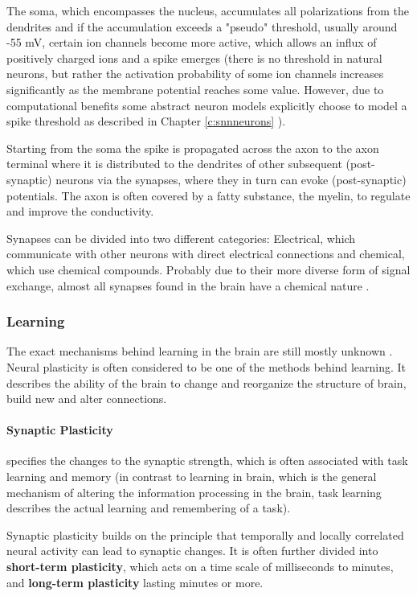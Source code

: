 The soma, which encompasses the nucleus, accumulates all polarizations from the dendrites and if the accumulation exceeds a "pseudo" threshold, usually around -55 mV, certain ion channels become more active, which allows an influx of positively charged ions and a spike emerges (there is no threshold in natural neurons, but rather the activation probability of some ion channels increases significantly as the membrane potential reaches some value. However, due to computational benefits some abstract neuron models explicitly choose to model a spike threshold as described in Chapter \ref{c:snnneurons} ).

Starting from the soma the spike is propagated across the axon to the axon terminal where it is distributed to the dendrites of other subsequent (post-synaptic) neurons via the synapses, where they in turn can evoke (post-synaptic) potentials.
The axon is often covered by a fatty substance, the myelin, to regulate and improve the conductivity.

Synapses can be divided into two different categories: Electrical, which communicate with other neurons with direct electrical connections and chemical, which use chemical compounds.
Probably due to their more diverse form of signal exchange, almost all synapses found in the brain have a chemical nature \cite{Byrne1997}.

\subsubsection{Learning} \label{c:natlearning}

The exact mechanisms behind learning in the brain are still mostly unknown \cite{Byrne1997, gerstner2014neuronal, Markram2012}.
Neural plasticity is often considered to be one of the methods behind learning. 
It describes the ability of the brain to change and reorganize the structure of brain, build new and alter connections.  

\paragraph{Synaptic Plasticity} \label{c:synplasiticity}
specifies the changes to the synaptic strength, which is often associated with task learning and memory (in contrast to learning in brain, which is the general mechanism of altering the information processing in the brain, task learning describes the actual learning and remembering of a task). 

Synaptic plasticity builds on the principle that temporally and locally correlated neural activity can lead to synaptic changes.
It is often further divided into \textbf{short-term plasticity}, which acts on a time scale of milliseconds to minutes, and \textbf{long-term plasticity} lasting minutes or more.


